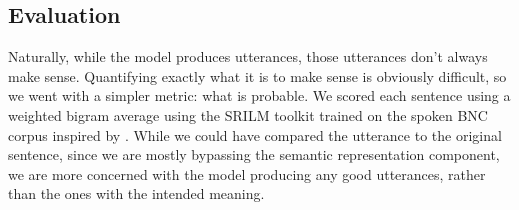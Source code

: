 \subsection{Evaluation}
Naturally, while the model produces utterances, those utterances don't always make sense. Quantifying exactly what it is to make sense is obviously difficult, so we went with a simpler metric: what is probable. We scored each sentence using a weighted bigram average using the SRILM toolkit trained on the spoken BNC corpus \citep{srilm} inspired by \citet{chart}. While we could have compared the utterance to the original sentence, since we are mostly bypassing the semantic representation component, we are more concerned with the model producing any good utterances, rather than the ones with the intended meaning.
